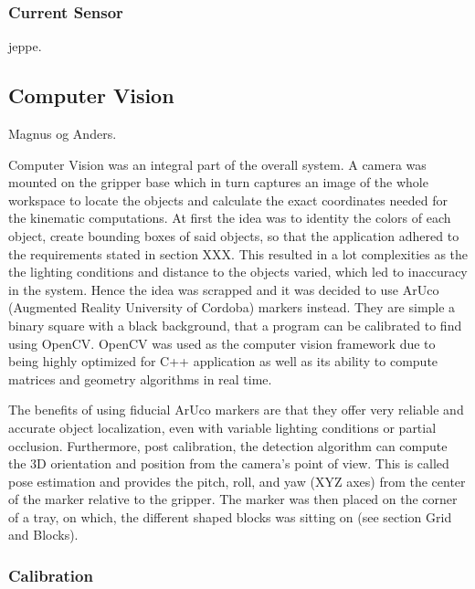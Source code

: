 \subsubsection{Current Sensor}
jeppe.

\subsection{}

\subsection{Computer Vision}
Magnus og Anders.

Computer Vision was an integral part of the overall system. A camera was mounted on the gripper base which in turn captures an image of the whole workspace to locate the objects and calculate the exact coordinates needed for the kinematic computations. At first the idea was to identity the colors of each object, create bounding boxes of said objects, so that the application adhered to the requirements stated in section XXX. This resulted in a lot complexities as the the lighting conditions and distance to the objects varied, which led to inaccuracy in the system. Hence the idea was scrapped and it was decided to use ArUco (Augmented Reality University of Cordoba) markers instead. They are simple a binary square with a black background, that a program can be calibrated to find using OpenCV.\cite{ArUco} OpenCV was used as the computer vision framework due to being highly optimized for C++ application as well as its ability to compute matrices and geometry algorithms in real time. 

The benefits of using fiducial ArUco markers are that they offer very reliable and accurate object localization, even with variable lighting conditions or partial occlusion. Furthermore, post calibration, the detection algorithm can compute the 3D orientation and position from the camera's point of view. This is called pose estimation and provides the pitch, roll, and yaw (XYZ axes) from the center of the marker relative to the gripper. The marker was then placed on the corner of a tray, on which, the different shaped blocks was sitting on (see section Grid and Blocks). 

\subsubsection{Calibration}


